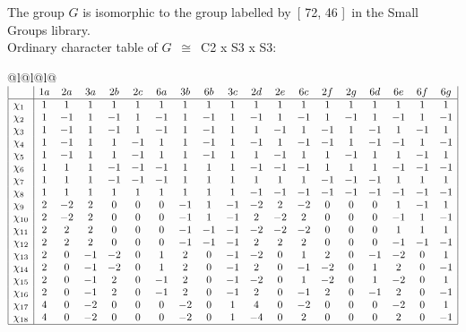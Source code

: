 \documentclass[varwidth=\maxdimen,border=10]{standalone}
\begin{document}
The group $G$ is isomorphic to the group labelled by\ [ 72, 46 ]\ in the Small Groups library.\\
Ordinary character table of $G$\ $\cong$\ C2 x S3 x S3:\\
\begin{center}
\begin{tabular}{@{}l@{}l@{}l@{}}
\hline
\(\begin{array}{|l|cccccccccccccccccc|}
  & 1a & 2a & 3a & 2b & 2c & 6a & 3b & 6b & 3c & 2d & 2e & 6c & 2f & 2g & 6d & 6e & 6f & 6g\\ \hline
\chi_{1} & 1 & 1 & 1 & 1 & 1 & 1 & 1 & 1 & 1 & 1 & 1 & 1 & 1 & 1 & 1 & 1 & 1 & 1\\
\chi_{2} & 1 & -1 & 1 & -1 & 1 & -1 & 1 & -1 & 1 & -1 & 1 & -1 & 1 & -1 & 1 & -1 & 1 & -1\\
\chi_{3} & 1 & -1 & 1 & -1 & 1 & -1 & 1 & -1 & 1 & 1 & -1 & 1 & -1 & 1 & -1 & 1 & -1 & 1\\
\chi_{4} & 1 & -1 & 1 & 1 & -1 & 1 & 1 & -1 & 1 & -1 & 1 & -1 & -1 & 1 & -1 & -1 & 1 & -1\\
\chi_{5} & 1 & -1 & 1 & 1 & -1 & 1 & 1 & -1 & 1 & 1 & -1 & 1 & 1 & -1 & 1 & 1 & -1 & 1\\
\chi_{6} & 1 & 1 & 1 & -1 & -1 & -1 & 1 & 1 & 1 & -1 & -1 & -1 & 1 & 1 & 1 & -1 & -1 & -1\\
\chi_{7} & 1 & 1 & 1 & -1 & -1 & -1 & 1 & 1 & 1 & 1 & 1 & 1 & -1 & -1 & -1 & 1 & 1 & 1\\
\chi_{8} & 1 & 1 & 1 & 1 & 1 & 1 & 1 & 1 & 1 & -1 & -1 & -1 & -1 & -1 & -1 & -1 & -1 & -1\\
\chi_{9} & 2 & -2 & 2 & 0 & 0 & 0 & -1 & 1 & -1 & -2 & 2 & -2 & 0 & 0 & 0 & 1 & -1 & 1\\
\chi_{10} & 2 & -2 & 2 & 0 & 0 & 0 & -1 & 1 & -1 & 2 & -2 & 2 & 0 & 0 & 0 & -1 & 1 & -1\\
\chi_{11} & 2 & 2 & 2 & 0 & 0 & 0 & -1 & -1 & -1 & -2 & -2 & -2 & 0 & 0 & 0 & 1 & 1 & 1\\
\chi_{12} & 2 & 2 & 2 & 0 & 0 & 0 & -1 & -1 & -1 & 2 & 2 & 2 & 0 & 0 & 0 & -1 & -1 & -1\\
\chi_{13} & 2 & 0 & -1 & -2 & 0 & 1 & 2 & 0 & -1 & -2 & 0 & 1 & 2 & 0 & -1 & -2 & 0 & 1\\
\chi_{14} & 2 & 0 & -1 & -2 & 0 & 1 & 2 & 0 & -1 & 2 & 0 & -1 & -2 & 0 & 1 & 2 & 0 & -1\\
\chi_{15} & 2 & 0 & -1 & 2 & 0 & -1 & 2 & 0 & -1 & -2 & 0 & 1 & -2 & 0 & 1 & -2 & 0 & 1\\
\chi_{16} & 2 & 0 & -1 & 2 & 0 & -1 & 2 & 0 & -1 & 2 & 0 & -1 & 2 & 0 & -1 & 2 & 0 & -1\\
\chi_{17} & 4 & 0 & -2 & 0 & 0 & 0 & -2 & 0 & 1 & 4 & 0 & -2 & 0 & 0 & 0 & -2 & 0 & 1\\
\chi_{18} & 4 & 0 & -2 & 0 & 0 & 0 & -2 & 0 & 1 & -4 & 0 & 2 & 0 & 0 & 0 & 2 & 0 & -1\\
\hline
\end{array}\)\\
\end{tabular}
\end{center}
\end{document}
